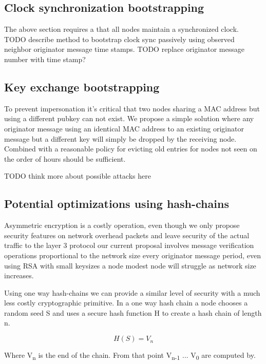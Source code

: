 \documentclass[11pt]{article}
\begin{document}
    \subsection{Clock synchronization bootstrapping}
    
               The above section requires a that all nodes maintain a synchronized clock. TODO describe method to bootstrap clock sync passively using observed neighbor originator message time stamps. TODO replace originator message number with time stamp?
    
    
    \subsection{Key exchange bootstrapping}
    
               To prevent impersonation it's critical that two nodes sharing a MAC address but using a different pubkey can not exist. We propose a simple solution where any originator message using an identical MAC address to an existing originator message but a different key will simply be dropped by the receiving node. Combined with a reasonable policy for evicting old entries for nodes not seen on the order of hours should be sufficient. 
               
               TODO think more about possible attacks here
    
    \subsection{Potential optimizations using hash-chains}
    
               Asymmetric encryption is a costly operation, even though we only propose security features on network overhead packets and leave security of the actual traffic to the layer 3 protocol our current proposal involves message verification operations proportional to the network size every originator message period, even using RSA with small keysizes a node modest node will struggle as network size increases.
               
               Using one way hash-chains we can provide a similar level of security with a much less costly cryptographic primitive. In a one way hash chain a node chooses a random seed S and uses a secure hash function H to create a hash chain of length n. 
               
               \[H(S) = V_n\] 
               
               Where V\textsubscript{n} is the end of the chain. From that point V\textsubscript{n-1} ... V\textsubscript{0} are computed by.
               
\end{document}
